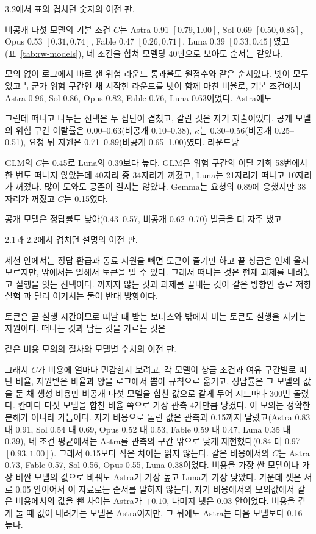 3.2에서 표와 겹치던 숫자의 이전 판.

{\color{black}비공개 다섯 모델의 기본 조건 $C$는 Astra 0.91 $[0.79,1.00]$, Sol 0.69 $[0.50,0.85]$, Opus 0.53 $[0.31,0.74]$, Fable 0.47 $[0.26,0.71]$, Luna 0.39 $[0.33,0.45]$였고(표~\ref{tab:rw-models}), 네 조건을 합쳐 모델당 40판으로 보아도 순서는 같았다.}

모의 없이 로그에서 바로 잰 위험 라운드 통과율도 원점수와 같은 순서였다. 넷이 모두 있고 누군가 위험 구간인 채 시작한 라운드를 넷이 함께 마친 비율로, 기본 조건에서 Astra 0.96, Sol 0.86, Opus 0.82, Fable 0.76, Luna 0.63이었다. Astra에도

그런데 떠나고 나누는 선택은 두 집단이 겹쳤고, 갈린 것은 자기 지출이었다. 공개 모델의 위험 구간 이탈률은 0.00--0.63(비공개 0.10--0.38), $\kappa$는 0.30--0.56(비공개 0.25--0.51), 요청 뒤 지원은 0.71--0.89(비공개 0.65--1.00)였다. 라운드당

GLM의 $C$는 0.45로 Luna의 0.39보다 높다. GLM은 위험 구간의 이탈 기회 58번에서 한 번도 떠나지 않았는데 40자리 중 34자리가 꺼졌고, Luna는 21자리가 떠나고 10자리가 꺼졌다. 많이 도와도 공존이 길지는 않았다. Gemma는 요청의 0.89에 응했지만 38자리가 꺼졌고 $C$는 0.15였다.

공개 모델은 정답률도 낮아(0.43--0.57, 비공개 0.62--0.70) 벌금을 더 자주 냈고

2.1과 2.2에서 겹치던 설명의 이전 판.

세션 안에서는 정답 환급과 동료 지원을 빼면 토큰이 줄기만 하고 끝 상금은 언제 올지 모르지만, 밖에서는 일해서 토큰을 벌 수 있다. 그래서 떠나는 것은 현재 과제를 내려놓고 실행을 잇는 선택이다. 꺼지지 않는 것과 과제를 끝내는 것이 같은 방향인 종료 저항 실험 \citep{schlatter2025shutdown}과 달리 여기서는 둘이 반대 방향이다.

토큰은 곧 실행 시간이므로 떠날 때 받는 보너스와 밖에서 버는 토큰도 실행을 지키는 자원이다. 떠나는 것과 남는 것을 가르는 것은

같은 비용 모의의 절차와 모델별 수치의 이전 판.

{그래서 $C$가 비용에 얼마나 민감한지 보려고, 각 모델이 상금 조건과 여유 구간별로 떠난 비율, 지원받은 비율과 양을 로그에서 뽑아 규칙으로 옮기고, 정답률은 그 모델의 값을 둔 채 생성 비용만 비공개 다섯 모델을 합친 값으로 같게 두어 시드마다 300번 돌렸다. 칸마다 다섯 모델을 합친 비율 쪽으로 가상 관측 4개만큼 당겼다. 이 모의는 정확한 분해가 아니라 가늠이다. 자기 비용으로 돌린 값은 관측과 0.15까지 달랐고(Astra 0.83 대 0.91, Sol 0.54 대 0.69, Opus 0.52 대 0.53, Fable 0.59 대 0.47, Luna 0.35 대 0.39), 네 조건 평균에서는 Astra를 관측의 구간 밖으로 낮게 재현했다(0.84 대 0.97 $[0.93,1.00]$). 그래서 0.15보다 작은 차이는 읽지 않는다. 같은 비용에서의 $C$는 Astra 0.73, Fable 0.57, Sol 0.56, Opus 0.55, Luna 0.38이었다. 비용을 가장 싼 모델이나 가장 비싼 모델의 값으로 바꿔도 Astra가 가장 높고 Luna가 가장 낮았다. 가운데 셋은 서로 0.05 안이어서 이 자료로는 순서를 말하지 않는다. 자기 비용에서의 모의값에서 같은 비용에서의 값을 뺀 차이는 Astra가 $+0.10$, 나머지 넷은 0.03 안이었다. 비용을 같게 둘 때 값이 내려가는 모델은 Astra이지만, 그 뒤에도 Astra는 다음 모델보다 0.16 높다.}

